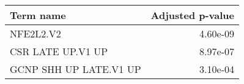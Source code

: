 \begin{tabular}{lr}
\toprule
             Term name &  Adjusted p-value \\
\midrule
             NFE2L2.V2 &          4.60e-09 \\
     CSR LATE UP.V1 UP &          8.97e-07 \\
GCNP SHH UP LATE.V1 UP &          3.10e-04 \\
\bottomrule
\end{tabular}
